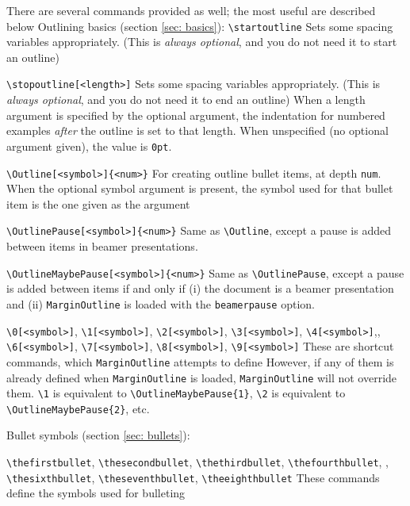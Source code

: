 \documentclass[11pt]{article}
\begin{document}
\1 There are several commands provided as well; the most useful are described below
\1 Outlining basics (section \ref{sec: basics}):
	\2 {\color{blue}\verb+\startoutline+}
		\3 Sets some spacing variables appropriately. (This is \textit{always optional}, and you do not need it to start an outline)

	\2 {\color{blue}\verb+\stopoutline[<length>]+}
		\3 Sets some spacing variables appropriately. (This is \textit{always optional}, and you do not need it to end an outline)
		\3 When a length argument is specified by the optional argument, the indentation for numbered examples \textit{after} the outline is set to that length.
		\3 When unspecified (no optional argument given), the value is \verb+0pt+.

	\2 {\color{blue}\verb+\Outline[<symbol>]{<num>}+}
		\3 For creating outline bullet items, at depth \verb+num+.
		\3 When the optional symbol argument is present, the symbol used for that bullet item is the one given as the argument

	\2 {\color{blue}\verb+\OutlinePause[<symbol>]{<num>}+}
		\3 Same as \verb+\Outline+, except a pause is added between items in beamer presentations.

	\2 {\color{blue}\verb+\OutlineMaybePause[<symbol>]{<num>}+}
		\3 Same as \verb+\OutlinePause+, except a pause is added between items if and only if (i) the document is a beamer presentation and (ii) \verb+MarginOutline+ is loaded with the \verb+beamerpause+ option.

	\2 {\color{blue}\verb+\0[<symbol>]+}, {\color{blue}\verb+\1[<symbol>]+}, {\color{blue}\verb+\2[<symbol>]+}, {\color{blue}\verb+\3[<symbol>]+}, {\color{blue}\verb+\4[<symbol>]+},\newline {\color{blue}\verb+\5[<symbol>]+}, {\color{blue}\verb+\6[<symbol>]+}, {\color{blue}\verb+\7[<symbol>]+}, {\color{blue}\verb+\8[<symbol>]+}, {\color{blue}\verb+\9[<symbol>]+}
		\3 These are shortcut commands, which \verb+MarginOutline+ attempts to define
			\4 However, if any of them is already defined when \verb+MarginOutline+ is loaded, \verb+MarginOutline+ will not override them.
		\3 \verb+\1+ is equivalent to \verb+\OutlineMaybePause{1}+, \verb+\2+ is equivalent to \verb+\OutlineMaybePause{2}+, etc.

\1 Bullet symbols (section \ref{sec: bullets}):
		
	\2 {\color{blue}\verb+\thefirstbullet+}, {\color{blue}\verb+\thesecondbullet+}, {\color{blue}\verb+\thethirdbullet+}, {\color{blue}\verb+\thefourthbullet+}, \linebreak{\color{blue}\verb+\thefifthbullet+}, {\color{blue}\verb+\thesixthbullet+}, {\color{blue}\verb+\theseventhbullet+}, {\color{blue}\verb+\theeighthbullet+}
		\3 These commands define the symbols used for bulleting
\end{document}
